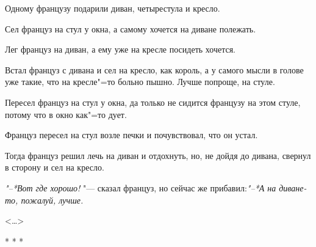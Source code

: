 Одному французу подарили диван, четырестула и кресло.

Сел француз на стул у окна, а самому хочется на диване полежать.

Лег француз на диван, а ему уже на кресле посидеть хочется.

Встал француз с дивана и сел на кресло, как король, а у самого мысли в голове уже такие, что на кресле"=то больно пышно. Лучше попроще, на стуле.

Пересел француз на стул у окна, да только не сидится французу на этом стуле, потому что в окно как"=то дует.

Француз пересел на стул возле печки и почувствовал, что он устал.

Тогда француз решил лечь на диван и отдохнуть, но, не дойдя до дивана, свернул в сторону и сел на кресло.

\textit{"--*Вот где хорошо!} "--- сказал француз, но
сейчас же прибавил:\textit{"--*А на диване-то, пожалуй, лучше.}

\begin{flushright}
<\dots{}>
\end{flushright}

\begin{center}
* * * 
\end{center}
